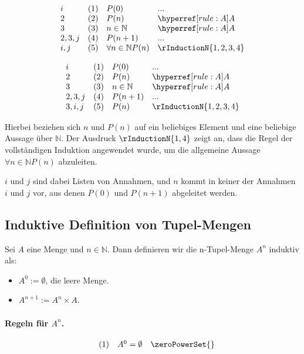 \documentclass[main.tex]{subfiles}
\begin{document}
\[
\begin{array}{llll}
    i & (1) & P(0) & ... \\
    2 & (2) & P(n) & \rA \\
    3 & (3) & n \in \mathbb{N} & \rA \\
    2,3,j & (4) & P(n+1) & ... \\
    i,j & (5) & \forall n \in \mathbb{N} P(n) & \rInductionN{1,2,3,4}
\end{array}
\]

\[
\begin{array}{llll}
    i & (1) & P(0) & ... \\
    2 & (2) & P(n) & \rA \\
    3 & (3) & n \in \mathbb{N} & \rA \\
    2,3,j & (4) & P(n+1) & ... \\
    3,i,j & (5) & P(n) & \rInductionN{1,2,3,4}
\end{array}
\]

Hierbei beziehen sich \(n\) und \(P(n)\) auf ein beliebiges Element und eine beliebige Aussage über \(\mathbb{N}\). Der Ausdruck \(\rInductionN{1,4}\) zeigt an, dass die Regel der vollständigen Induktion angewendet wurde, um die allgemeine Aussage \(\forall n \in \mathbb{N} P(n)\) abzuleiten.

\(i\) und \(j\) sind dabei Listen von Annahmen, und \(n\) kommt in keiner der Annahmen \(i\) und \(j\) vor, aus denen \(P(0)\) und \(P(n+1)\) abgeleitet werden.






\subsection{Induktive Definition von Tupel-Mengen}

\begin{definition}
Sei $A$ eine Menge und $n \in \mathbb{N}$. Dann definieren wir die n-Tupel-Menge $A^n$ induktiv als:
\begin{itemize}
    \item $A^0 := \emptyset$, die leere Menge.
    \item $A^{n+1} := A^n \times A$.
\end{itemize}
\end{definition}

\paragraph{Regeln für \( A^n \).}
\label{rule:zeroPowerSet} \label{rule:nextPowerSet}
\[
\begin{array}{llll}
	& (1) & A^0=\emptyset & \zeroPowerSet{} \\
\end{array}
\]
\end{document}
